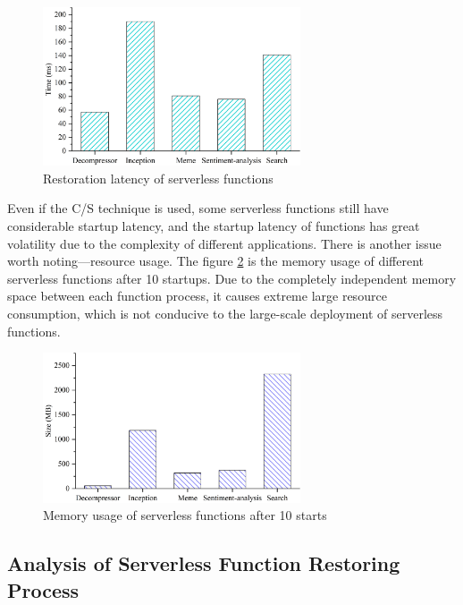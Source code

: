 \begin{figure}[t]
    \centering
    \includegraphics[width=3in]{images/default-restore.png}
    \caption{Restoration latency of serverless functions}
    \label{default-restore}
\end{figure}

Even if the C/S technique is used, some serverless functions still have considerable startup latency,
and the startup latency of functions has great volatility due to the complexity of different applications.
There is another issue worth noting—resource usage.
The figure \ref{restore-mem} is the memory usage of different serverless functions after 10 startups.
Due to the completely independent memory space between each function process,
it causes extreme large resource consumption,
which is not conducive to the large-scale deployment of serverless functions.

\begin{figure}[t]
    \centering
    \includegraphics[width=3in]{images/default-resotre-mem.png}
    \caption{Memory usage of serverless functions after 10 starts}
    \label{restore-mem}
\end{figure}

\subsection{Analysis of Serverless Function Restoring Process}


